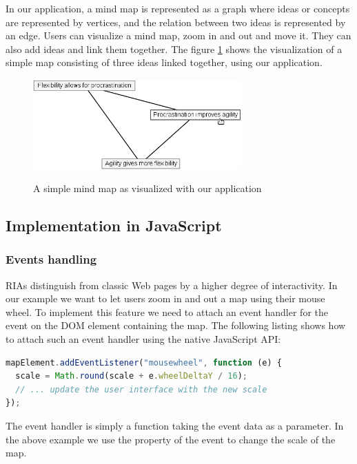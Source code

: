 \documentclass[american,english,runningheads]{llncs}
\begin{document}
In our application, a mind map is represented as a graph where ideas or concepts are represented by vertices, and the relation between two ideas is represented by an edge. Users can visualize a mind map, zoom in and out and move it. They can also add ideas and link them together. The figure \ref{mindmap} shows the visualization of a simple map consisting of three ideas linked together, using our application.

\begin{figure}
 \caption{A simple mind map as visualized with our application}
 \centering
 \includegraphics[width=8cm]{mindmap.png}
 \label{mindmap}
\end{figure}

\subsection{Implementation in JavaScript}

\subsubsection{Events handling}

RIAs distinguish from classic Web pages by a higher degree of interactivity. In our example we want to let users zoom in and out a map using their mouse wheel. To implement this feature we need to attach an event handler for the  event on the DOM element containing the map. The following listing shows how to attach such an event handler using the native JavaScript API:

\begin{lstlisting}[language=JavaScript,label=event-js,caption=Native JavaScript API to handle events]
mapElement.addEventListener("mousewheel", function (e) {
  scale = Math.round(scale + e.wheelDeltaY / 16);
  // ... update the user interface with the new scale
});
\end{lstlisting}

The event handler is simply a function taking the event data as a parameter. In the above example we use the  property of the event to change the scale of the map.
\end{document}
